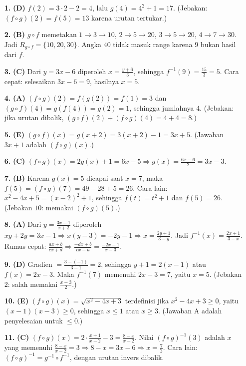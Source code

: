 \documentclass[a4paper,11pt]{article}
\newcommand{\dis}{\displaystyle}
\begin{document}
\small\begin{enumerate}[leftmargin=2em,itemsep=2pt,topsep=2pt]
\item[\textbf{1.}] \textbf{(D)} $f(2)=3\cdot2-2=4$, lalu $g(4)=4^2+1=17$. (Jebakan: $(f\circ g)(2)=f(5)=13$ karena urutan tertukar.)
\item[\textbf{2.}] \textbf{(B)} $g\circ f$ memetakan $1\to3\to10$, $2\to5\to20$, $3\to5\to20$, $4\to7\to30$. Jadi $R_{g\circ f}=\{10,20,30\}$. Angka $40$ tidak masuk range karena $9$ bukan hasil dari $f$.
\item[\textbf{3.}] \textbf{(C)} Dari $y=3x-6$ diperoleh $x=\dis\frac{y+6}{3}$, sehingga $f^{-1}(9)=\dis\frac{15}{3}=5$. Cara cepat: selesaikan $3x-6=9$, hasilnya $x=5$.
\item[\textbf{4.}] \textbf{(A)} $(f\circ g)(2)=f(g(2))=f(1)=3$ dan $(g\circ f)(4)=g(f(4))=g(2)=1$, sehingga jumlahnya $4$. (Jebakan: jika urutan dibalik, $(g\circ f)(2)+(f\circ g)(4)=4+4=8$.)
\item[\textbf{5.}] \textbf{(E)} $(g\circ f)(x)=g(x+2)=3(x+2)-1=3x+5$. (Jawaban $3x+1$ adalah $(f\circ g)(x)$.)
\item[\textbf{6.}] \textbf{(C)} $(f\circ g)(x)=2g(x)+1=6x-5\Rightarrow g(x)=\dis\frac{6x-6}{2}=3x-3$.
\item[\textbf{7.}] \textbf{(B)} Karena $g(x)=5$ dicapai saat $x=7$, maka $f(5)=(f\circ g)(7)=49-28+5=26$. Cara lain: $x^2-4x+5=(x-2)^2+1$, sehingga $f(t)=t^2+1$ dan $f(5)=26$. (Jebakan $10$: memakai $(f\circ g)(5)$.)
\item[\textbf{8.}] \textbf{(A)} Dari $y=\dis\frac{3x-1}{x+2}$ diperoleh $xy+2y=3x-1\Rightarrow x(y-3)=-2y-1\Rightarrow x=\dis\frac{2y+1}{3-y}$. Jadi $f^{-1}(x)=\dis\frac{2x+1}{3-x}$. Rumus cepat: $\dis\frac{ax+b}{cx+d}\Rightarrow\dis\frac{-dx+b}{cx-a}=\dis\frac{-2x-1}{x-3}$.
\item[\textbf{9.}] \textbf{(D)} Gradien $=\dis\frac{3-(-1)}{3-1}=2$, sehingga $y+1=2(x-1)$ atau $f(x)=2x-3$. Maka $f^{-1}(7)$ memenuhi $2x-3=7$, yaitu $x=5$. (Jebakan $2$: salah memakai $\frac{x-3}{2}$.)
\item[\textbf{10.}] \textbf{(E)} $(f\circ g)(x)=\sqrt{x^2-4x+3}$ terdefinisi jika $x^2-4x+3\ge0$, yaitu $(x-1)(x-3)\ge0$, sehingga $x\le1$ atau $x\ge3$. (Jawaban A adalah penyelesaian untuk $\le0$.)
\item[\textbf{11.}] \textbf{(C)} $(f\circ g)(x)=2\cdot\dis\frac{x+1}{x-2}-3=\dis\frac{8-x}{x-2}$. Nilai $(f\circ g)^{-1}(3)$ adalah $x$ yang memenuhi $\dis\frac{8-x}{x-2}=3\Rightarrow8-x=3x-6\Rightarrow x=\dis\frac72$. Cara lain: $(f\circ g)^{-1}=g^{-1}\circ f^{-1}$, dengan urutan invers dibalik.

\end{enumerate}
\end{document}
